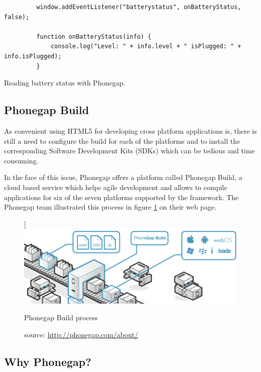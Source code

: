\begin{listing}\centering
  \begin{minipage}{.8\textwidth}
    \begin{verbatim}
	     window.addEventListener("batterystatus", onBatteryStatus, false);
	     
	     function onBatteryStatus(info) {
	         console.log("Level: " + info.level + " isPlugged: " + info.isPlugged);
	     }
    \end{verbatim}
  \end{minipage}
  \caption{Reading battery status with Phonegap.}\label{lst:phonegap1}
\end{listing}

\subsection*{Phonegap Build}

As convenient using HTML5 for developing cross platform applications is, there is still a need to configure the build for each of the platforms and to install the corresponding Software Development Kits (SDKs) which can be tedious and time consuming.

In the face of this issue, Phonegap offers a platform called Phonegap Build, a cloud based service which helps agile development and allows to compile applications for six of the seven platforms supported by the framework. The Phonegap team illustrated this process in figure \ref{fig:phonegapbuild} on their web page.

\begin{figure}[h]]
  \centering
  \includegraphics[width=.8\textwidth]{fig/phonegap-build}
  \caption{Phonegap Build process}
  \caption*{source: \url{http://phonegap.com/about/}}
  \label{fig:phonegapbuild}
\end{figure} 

\subsection*{Why Phonegap?}

